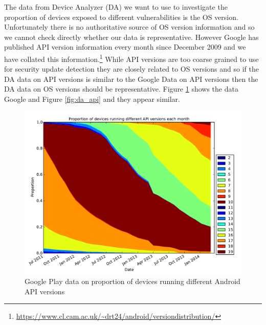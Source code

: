 \documentclass[conference,a4paper,twoside]{IEEEtran}
\begin{document}
The data from Device Analyzer (DA) we want to use to investigate the proportion of devices exposed to different vulnerabilities is the OS version.
Unfortunately there is no authoritative source of OS version information and so we cannot check directly whether our data is representative.
However Google has published API version information every month since December 2009 and we have collated this information.\footnote{\url{https://www.cl.cam.ac.uk/~drt24/android/versiondistribution/}}
While API versions are too coarse grained to use for security update detection they are closely related to OS versions and so if the DA data on API versions is similar to the Google Data on API versions then the DA data on OS versions should be representative.
Figure \ref{fig:play_api} shows the data Google and Figure \ref{fig:da_api} and they appear similar. %
\begin{figure}
 \centering
 \includegraphics[width=\columnwidth]{figures/play_norm_api_trunc}
 \caption{Google Play data on proportion of devices running different Android API versions}
 \label{fig:play_api}
\end{figure}
\end{document}
